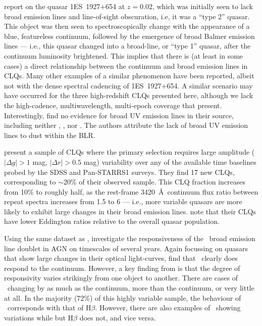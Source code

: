 \documentclass[fleqn,usenatbib]{mnras}
\begin{document}
\citet{Trakhtenbrot2019} report on the quasar 1ES~1927+654 at
$z=0.02$, which was initially seen to lack broad emission lines and
line-of-sight obscuration, i.e, it was a ``type 2'' quasar. This
object was then seen to spectroscopically change with the appearance
of a blue, featureless continuum, followed by the emergence of broad
Balmer emission lines --- i.e., this quasar changed into a broad-line,
or ``type 1'' quasar, after the continuum luminosity brightened.  This
implies that there is (at least in some cases) a direct relationship
between the continuum and broad emission lines in CLQs.  Many other
examples of a similar phenomenon have been reported, albeit not with
the dense spectral cadencing of 1ES~1927+654.  A similar scenario may
have occurred for the three high-redshift CLQs presented here,
although we lack the high-cadence, multiwavelength, multi-epoch
coverage that \citet{Trakhtenbrot2019} present.  Interestingly,
\citet{Trakhtenbrot2019} find no evidence for broad UV emission lines
in their source, including neither \civ, \ciii, nor \mgii.  The
authors attribute the lack of broad UV emission lines to dust within
the BLR.

\citet{MacLeod2019} present a sample of CLQs where the primary
selection requires large amplitude ($| \Delta g | > 1$ mag, $| \Delta
r | > 0.5$ mag) variability over any of the available time baselines
probed by the SDSS and Pan-STARRS1 surveys. They find 17 new CLQs,
corresponding to $\sim 20$\% of their observed sample. This CLQ
fraction increases from 10\% to roughly half, as the rest-frame
3420~\AA\ continuum flux ratio between repeat spectra increases from
1.5 to 6 --- i.e., more variable quasars are more likely to exhibit
large changes in their broad emission lines. \citet{MacLeod2019} note
that their CLQs have lower Eddington ratios relative to the overall
quasar population.

Using the same dataset as \citet{MacLeod2019}, \citet{Homan2020}
investigate the responsiveness of the \mgii\ broad emission line
doublet in AGN on timescales of several years.  Again focussing on
quasars that show large changes in their optical light-curves,
\citet{Homan2020} find that \mgii\ clearly does respond to the
continuum.  However, a key finding from \citet{Homan2020} is that the
degree of responsivity varies strikingly from one object to another.
There are cases of \mgii\ changing by as much as the continuum, more
than the continuum, or very little at all.  In the majority (72\%) of
this highly variable sample, the behaviour of \mgii\ corresponds with
that of H$\beta$.  However, there are also examples of \mgii\ showing
variations while but H$\beta$ does not, and vice versa.
\end{document}
